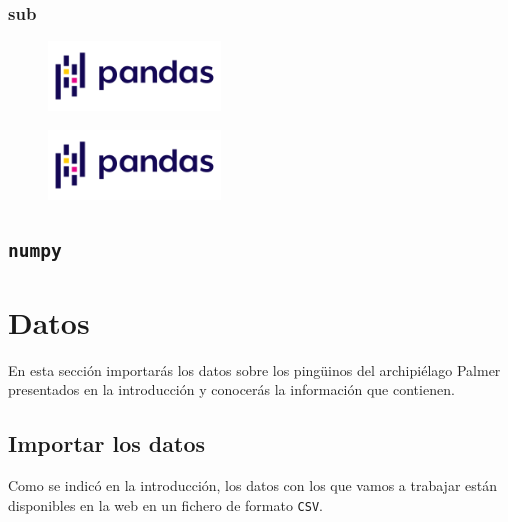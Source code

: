 \documentclass[
  a4paper,
  noprof,
  12pt,
  notoc,
  nosols,
  nobib]{mnye}
\theoremstyle{definition}
\theoremstyle{remark}
\begin{document}
\hypertarget{sub}{%
\subsubsection{sub}\label{sub}}

\begin{figure}[tbph]

{\centering \includegraphics[width=\textwidth,height=5em]{chapters/../img/pandas.png}

}

\end{figure}

\begin{figure}[tbph]

{\centering \includegraphics[width=\textwidth,height=5em]{chapters/../img/pandas.png}

}

\end{figure}

\hypertarget{numpy}{%
\subsection{\texorpdfstring{\texttt{numpy}}{numpy}}\label{numpy}}


\hypertarget{datos}{%
\section{Datos}\label{datos}}

En esta sección importarás los datos sobre los pingüinos del
archipiélago Palmer presentados en la introducción y conocerás la
información que contienen.

\hypertarget{importar-los-datos}{%
\subsection{Importar los datos}\label{importar-los-datos}}

Como se indicó en la introducción, los datos con los que vamos a
trabajar están disponibles en la web en un fichero de formato
\texttt{CSV}.
\end{document}
